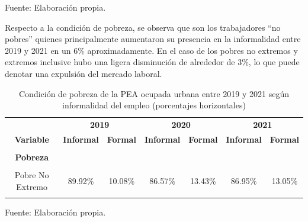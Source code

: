 \documentclass[
  letterpaper,
  12pt,
  oneside,
  spanish,
  doublespacing,
  headsepline,
  parskip]{MastersDoctoralThesis}
\begin{document}
\noindent \small Fuente: Elaboración propia. \normalsize

Respecto a la condición de pobreza, se observa que son los trabajadores
``no pobres'' quienes principalmente aumentaron su presencia en la
informalidad entre 2019 y 2021 en un 6\% aproximadamente. En el caso de
los pobres no extremos y extremos inclusive hubo una ligera disminución
de alrededor de 3\%, lo que puede denotar una expulsión del mercado
laboral.

\hypertarget{tbl-pobr}{}
\begin{table}[H]
\caption{\label{tbl-pobr}Condición de pobreza de la PEA ocupada urbana entre 2019 y 2021 según
informalidad del empleo (porcentajes horizontales) }\tabularnewline

\centering\begingroup\fontsize{10}{12}\selectfont

\begin{tabular}{ccccccc}
\toprule
\multicolumn{1}{c}{ } & \multicolumn{2}{c}{\textbf{2019}} & \multicolumn{2}{c}{\textbf{2020}} & \multicolumn{2}{c}{\textbf{2021}} \\
\cmidrule(l{3pt}r{3pt}){2-3} \cmidrule(l{3pt}r{3pt}){4-5} \cmidrule(l{3pt}r{3pt}){6-7}
\textbf{Variable} & \textbf{Informal} & \textbf{Formal} & \textbf{Informal} & \textbf{Formal} & \textbf{Informal} & \textbf{Formal}\\
\midrule
\cellcolor{gray!6}{\textbf{Nacional}} & \cellcolor{gray!6}{66.40\%} & \cellcolor{gray!6}{33.60\%} & \cellcolor{gray!6}{68.42\%} & \cellcolor{gray!6}{31.58\%} & \cellcolor{gray!6}{71.41\%} & \cellcolor{gray!6}{28.59\%}\\
\textbf{Pobreza} &  &  &  &  &  & \\
\cellcolor{gray!6}{Pobre Extremo} & \cellcolor{gray!6}{98.97\%} & \cellcolor{gray!6}{1.03\%} & \cellcolor{gray!6}{94.30\%} & \cellcolor{gray!6}{5.70\%} & \cellcolor{gray!6}{94.16\%} & \cellcolor{gray!6}{5.84\%}\\
Pobre No Extremo & 89.92\% & 10.08\% & 86.57\% & 13.43\% & 86.95\% & 13.05\%\\
\cellcolor{gray!6}{No Pobre} & \cellcolor{gray!6}{63.81\%} & \cellcolor{gray!6}{36.19\%} & \cellcolor{gray!6}{64.26\%} & \cellcolor{gray!6}{35.74\%} & \cellcolor{gray!6}{68.46\%} & \cellcolor{gray!6}{31.54\%}\\
\bottomrule
\end{tabular}
\endgroup{}
\end{table}

\noindent \small Fuente: Elaboración propia. \normalsize
\end{document}
